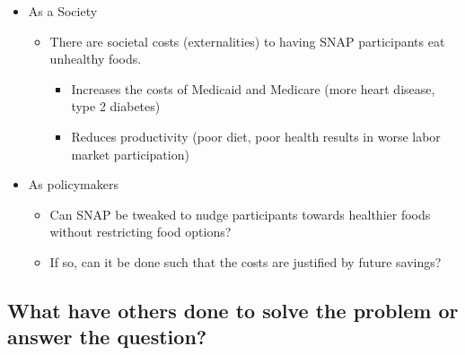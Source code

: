 \documentclass[11pt,letterpaper,]{book}
\providecommand{\tightlist}{%
  \setlength{\itemsep}{0pt}\setlength{\parskip}{0pt}}
\begin{document}
\begin{itemize}
\tightlist
\item
  As a Society

  \begin{itemize}
  \tightlist
  \item
    There are societal costs (externalities) to having SNAP participants
    eat unhealthy foods.

    \begin{itemize}
    \tightlist
    \item
      Increases the costs of Medicaid and Medicare (more heart disease,
      type 2 diabetes)
    \item
      Reduces productivity (poor diet, poor health results in worse
      labor market participation)
    \end{itemize}
  \end{itemize}
\item
  As policymakers

  \begin{itemize}
  \tightlist
  \item
    Can SNAP be tweaked to nudge participants towards healthier foods
    without restricting food options?
  \item
    If so, can it be done such that the costs are justified by future
    savings?
  \end{itemize}
\end{itemize}

\subsection{What have others done to solve the problem or answer the
question?}\label{what-have-others-done-to-solve-the-problem-or-answer-the-question}
\end{document}
